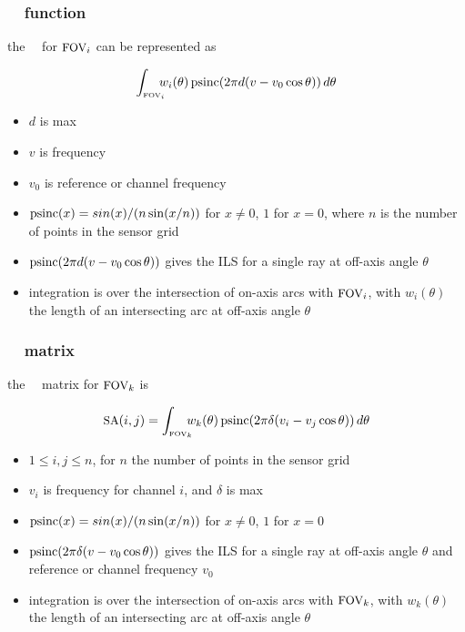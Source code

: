 \documentclass[11pt]{beamer}
\begin{document}
\begin{frame}
\frametitle{\ccast\ \ils\ function}

the \ccast\ \ils\ for $\mbox{\small FOV}_i$ can be represented as

\[\int_{\mbox{\tiny FOV}_i} \!\!\!\! w_i(\theta)\, \mbox{psinc}(2 \pi
                 d(v - v_0 \cos \theta ))\, d\theta \]


\begin{itemize}
  \item $d$ is max \opd
  \item $v$ is frequency
  \item $v_0$ is reference or channel frequency
  \item $\mbox{psinc}(x) = sin(x)/(n \sin(x/n))$ for $x \ne 0$,  $1$ for
    $x = 0$, where $n$ is the number of points in the sensor grid
   \item $\mbox{psinc}(2 \pi d(v - v_0 \cos \theta ))$ gives the ILS for a
    single ray at off-axis angle $\theta$
  \item integration is over the intersection of on-axis arcs with
    $\mbox{\small FOV}_i$, with $w_i(\theta)$ the length of an intersecting arc
    at off-axis angle $\theta$
\end{itemize}

\end{frame}
\begin{frame}
\frametitle{\ccast\ \SA\ matrix}

the \ccast\ \SA\ matrix for $\mbox{\small FOV}_k$ is

\[\mbox{\small SA}(i,j) = \int_{\mbox{\tiny FOV}_k} \!\!\!\! w_k(\theta)\, \mbox{psinc}(2 \pi
                 \delta(v_i - v_j \cos \theta ))\, d\theta \]

\begin{itemize}
  \item $1 \le i,j \le n$, for $n$ the number of points in the
    sensor grid
  \item $v_i$ is frequency for channel $i$, and $\delta$ is max \opd
  \item $\mbox{psinc}(x) = sin(x)/(n \sin(x/n))$ for $x \ne 0$,  $1$ for
    $x = 0$
   \item $\mbox{psinc}(2 \pi \delta(v - v_0 \cos \theta ))$ gives the ILS
     for a single ray at off-axis angle $\theta$ and reference or
     channel frequency $v_0$
  \item integration is over the intersection of on-axis arcs with
    $\mbox{\small FOV}_k$, with $w_k(\theta)$ the length of an intersecting arc
    at off-axis angle $\theta$
\end{itemize}

\end{frame}
\end{document}
